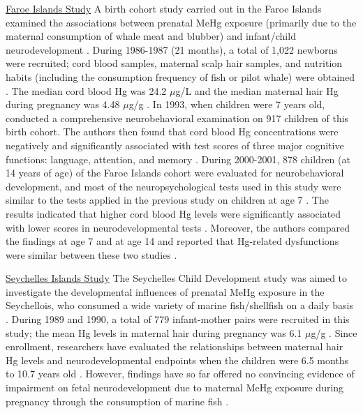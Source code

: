 \underline{Faroe Islands Study} A birth cohort study carried out in the Faroe Islands examined the associations between prenatal MeHg exposure (primarily due to the maternal consumption of whale meat and blubber) and infant/child neurodevelopment \cite{grandjean1992impact,grandjean1997cognitive}. During 1986-1987 (21 months), a total of 1,022 newborns were recruited; cord blood samples, maternal scalp hair samples, and nutrition habits (including the consumption frequency of fish or pilot whale) were obtained \cite{grandjean1992impact}. The median cord blood Hg was 24.2 \({\mu}\)g/L and the median maternal hair Hg during pregnancy was 4.48 \({\mu}\)g/g \cite{grandjean1992impact}. In 1993, when children were 7 years old, \cite{grandjean1992impact} conducted a comprehensive neurobehavioral examination on 917 children of this birth cohort. The authors then found that cord blood Hg concentrations were negatively and significantly associated with test scores of three major cognitive functions: language, attention, and memory \cite{grandjean1992impact}. During 2000-2001, 878 children (at 14 years of age) of the Faroe Islands cohort were evaluated for neurobehavioral development, and most of the neuropsychological tests used in this study were similar to the tests applied in the previous study on children at age 7 \cite{debes2006impact}. The results indicated that higher cord blood Hg levels were significantly associated with lower scores in neurodevelopmental tests \cite{debes2006impact}. Moreover, the authors compared the findings at age 7 and at age 14 and reported that Hg-related dysfunctions were similar between these two studies \cite{debes2006impact}.

\underline{Seychelles Islands Study} The Seychelles Child Development study was aimed to investigate the developmental influences of prenatal MeHg exposure in the Seychellois, who consumed a wide variety of marine fish/shellfish on a daily basis \cite{davidson2006prenatal}. During 1989 and 1990, a total of 779 infant-mother pairs were recruited in this study; the mean Hg levels in maternal hair during pregnancy was 6.1 \({\mu}\)g/g \cite{marsh1994seychelles}. Since enrollment, researchers have evaluated the relationships between maternal hair Hg levels and neurodevelopmental endpoints when the children were 6.5 months to 10.7 years old \cite{davidson1998effects,davidson2006prenatal,davidson2008association,myers2003prenatal}. However, findings have so far offered no convincing evidence of impairment on fetal neurodevelopment due to maternal MeHg exposure during pregnancy through the consumption of marine fish \cite{davidson2006prenatal,davidson2008association}. 

